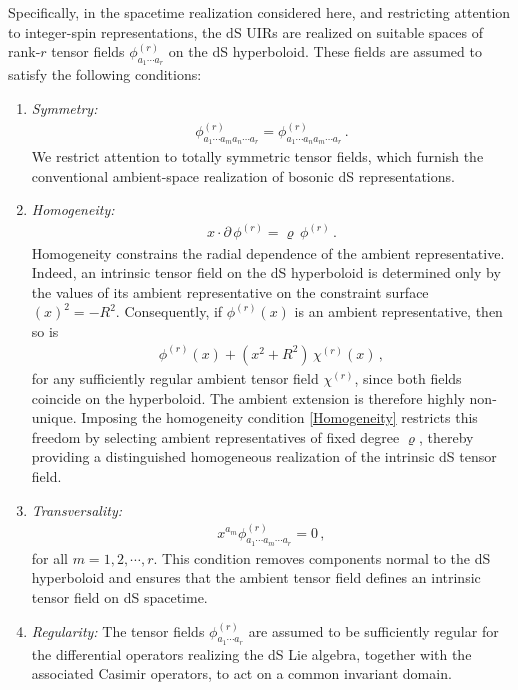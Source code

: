 \documentclass[aps,twocolumn,nofootinbib]{revtex4}
\begin{document}
Specifically, in the spacetime realization considered here, and restricting attention to integer-spin representations, the dS UIRs are realized on suitable spaces of rank-$r$ tensor fields $\phi^{(r)}_{a_1\cdots a_r}$ on the dS hyperboloid. These fields are assumed to satisfy the following conditions:
\begin{enumerate}
    \item{\emph{Symmetry:} 
    \begin{align}
        \phi^{(r)}_{a_1\cdots a_m a_n\cdots a_r} = \phi^{(r)}_{a_1\cdots a_n a_m\cdots a_r} \,.
    \end{align}
    We restrict attention to totally symmetric tensor fields, which furnish the conventional ambient-space realization of bosonic dS representations.}

    \item{\emph{Homogeneity:}
    \begin{align} \label{Homogeneity}
        x\cdot\partial\,\phi^{(r)} = \varrho\,\phi^{(r)} \,.
    \end{align}
    Homogeneity constrains the radial dependence of the ambient representative. Indeed, an intrinsic tensor field on the dS hyperboloid is determined only by the values of its ambient representative on the constraint surface $(x)^2=-R^2$. Consequently, if $\phi^{(r)}(x)$ is an ambient representative, then so is 
    \begin{align}
        \phi^{(r)}(x) + (x^2+R^2)\, \chi^{(r)}(x) \,,
    \end{align}
    for any sufficiently regular ambient tensor field $\chi^{(r)}$, since both fields coincide on the hyperboloid. The ambient extension is therefore highly non-unique. Imposing the homogeneity condition \eqref{Homogeneity} restricts this freedom by selecting ambient representatives of fixed degree $\varrho$, thereby providing a distinguished homogeneous realization of the intrinsic dS tensor field.}

    \item{\emph{Transversality:}
    \begin{align}
        x^{a_m}\phi^{(r)}_{a_1\cdots a_m\cdots a_r}=0 \,,
    \end{align}
    for all $m=1,2,\cdots,r$. This condition removes components normal to the dS hyperboloid and ensures that the ambient tensor field defines an intrinsic tensor field on dS spacetime.}

    \item{\emph{Regularity:} The tensor fields $\phi^{(r)}_{a_1\cdots a_r}$ are assumed to be sufficiently regular for the differential operators realizing the dS Lie algebra, together with the associated Casimir operators, to act on a common invariant domain.}


\end{enumerate}
\end{document}
